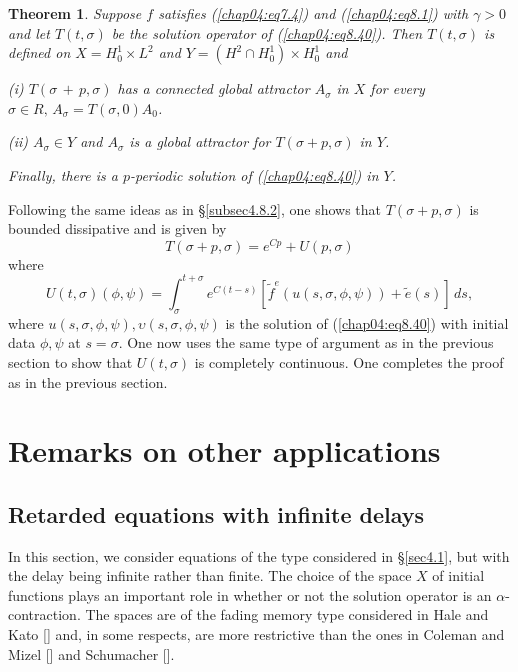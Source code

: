 \documentclass{surv-l}
\theoremstyle{plain}
\newtheorem{theorem}{Theorem}[section]
\theoremstyle{definition}
\numberwithin{equation}{section}
\numberwithin{figure}{chapter}
\begin{document}
\begin{theorem}\label{thm4.8.17}
Suppose $f$ satisfies \emph{(\ref{chap04:eq7.4})} and \emph{(\ref{chap04:eq8.1})} with $\gamma>0$ and let
$T(t, \sigma)$ be the solution operator of \emph{(\ref{chap04:eq8.40})}. Then $T(t, \sigma)$ is defined on $X=H_{0}^{1}\times L^{2}$ and $Y=(H^{2}\cap H_{0}^{1})\times H_{0}^{1}$ and

\textrm{(i)} $T(\sigma\,+\,p, \sigma)$ has a connected global attractor $A_{\sigma}$ in $X$ for every $\sigma\in R,\, A_{\sigma}=T(\sigma, 0)A_{0}$.

\textrm{(ii)} $A_{\sigma}\in Y$ and $A_{\sigma}$ is a global attractor for $T(\sigma+p, \sigma)$ in $Y$.

\noindent Finally, there is a $p$-periodic solution of \emph{(\ref{chap04:eq8.40})} in $Y$.
\end{theorem}

Following the same ideas as in \S \ref{subsec4.8.2}, one shows that $T(\sigma+p, \sigma)$ is bounded dissipative and is given by
\begin{equation*}
T(\sigma+p, \sigma)=e^{Cp}+U(p, \sigma)
\end{equation*}
where
\begin{equation*}
U(t, \sigma)(\phi, \psi)=\int^{t+\sigma}_{\sigma}e^{C(t-s)}[\tilde{f}^{e}(u(s, \sigma, \phi, \psi))+\tilde{e}(s)]\,ds,
\end{equation*}
where $u(s, \sigma, \phi, \psi), \upsilon(s, \sigma, \phi, \psi)$ is the solution of (\ref{chap04:eq8.40}) with initial data $\phi,\psi$ at $s =\sigma$. One now uses the same type of argument as in the previous section to show that $U(t, \sigma)$ is completely continuous. One completes the proof as in the previous section.

\section{Remarks on other applications}\label{sec4.9}
\subsection{Retarded equations with infinite delays}\label{subsec4.9.1} In this section, we consider equations of the type considered in \S\ref{sec4.1}, but with the delay being infinite rather than finite. The choice of the space $X$ of initial functions plays an important role in whether or not the solution operator is an $\alpha$-contraction. The spaces are of the fading memory type considered in Hale and Kato [\citeyear{1978hk}] and, in some respects, are more restrictive than the ones in Coleman and Mizel [\citeyear{1968cm}] and Schumacher [\citeyear{1978s}].
\end{document}
